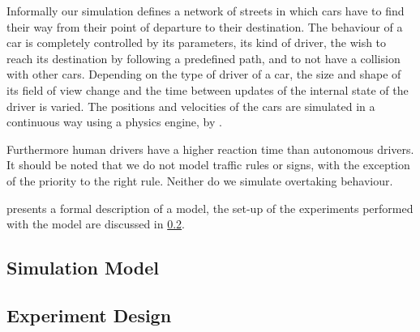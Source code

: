 Informally our simulation defines a network of streets in which cars have to find their way from their point of departure to their destination. The behaviour of a car is completely controlled by its parameters, its kind of driver, the wish to reach its destination by following a predefined path, and to not have a collision with other cars. Depending on the type of driver of a car, the size and shape of its field of view change and the time between updates of the internal state of the driver is varied. The positions and velocities of the cars are simulated in a continuous way using a physics engine, \cite{murphy2010jbox2d} by \citeauthor{murphy2010jbox2d}.

Furthermore human drivers have a higher reaction time than autonomous drivers. It should be noted that we do not model traffic rules or signs, with the exception of the priority to the right rule. Neither do we simulate overtaking behaviour.

 presents a formal description of a model, the set-up of the experiments performed with the model are discussed in \cref{sub:method:design}.

\subsection{Simulation Model}
\label{sub:method:model}


\subsection{Experiment Design}
\label{sub:method:design}
